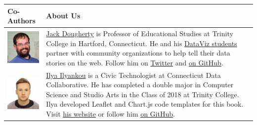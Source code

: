 \documentclass[
  english,
]{book}
\begin{document}
\begin{longtable}[]{@{}ll@{}}
\toprule
\begin{minipage}[b]{0.50\columnwidth}\raggedright
Co-Authors\strut
\end{minipage} & \begin{minipage}[b]{0.44\columnwidth}\raggedright
About Us\strut
\end{minipage}\tabularnewline
\midrule
\endhead
\begin{minipage}[t]{0.50\columnwidth}\raggedright
\includegraphics{images/0-introduction/DoughertyJack-96.jpg}\strut
\end{minipage} & \begin{minipage}[t]{0.44\columnwidth}\raggedright
\href{http://bit.ly/jackdougherty}{Jack Dougherty} is Professor of Educational Studies at Trinity College in Hartford, Connecticut. He and his \href{http://commons.trincoll.edu/dataviz}{DataViz students} partner with community organizations to help tell their data stories on the web. Follow him on \href{https://twitter.com/doughertyjack}{Twitter} and \href{https://github/com/jackdougherty}{on GitHub}.\strut
\end{minipage}\tabularnewline
\begin{minipage}[t]{0.50\columnwidth}\raggedright
\includegraphics{images/0-introduction/IlyankouIlya-96.jpg}\strut
\end{minipage} & \begin{minipage}[t]{0.44\columnwidth}\raggedright
\href{https://www.linkedin.com/in/ilya-ilyankou-a64675ab}{Ilya Ilyankou} is a Civic Technologist at Connecticut Data Collaborative. He has completed a double major in Computer Science and Studio Arts in the Class of 2018 at Trinity College. Ilya developed Leaflet and Chart.js code templates for this book. Visit \href{http://ilyankou.com}{his website} or follow him \href{https://github.com/ilyankou}{on GitHub}.\strut
\end{minipage}\tabularnewline

\end{longtable}
\end{document}
